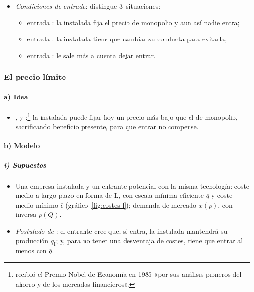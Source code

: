 \documentclass[11pt]{article}
\begin{document}
\begin{itemize}
\begin{itemize}
  \item {}, las que crean las propias instaladas con su conducta: el precio límite, la capacidad, la proliferación de marcas, la depredación o el aumento de los costes de los rivales. Para que disuadan, tienen que ser \emph{creíbles}, y eso es lo que la teoría de juegos permite juzgar .
  \end{itemize}
\item \emph{Condiciones de entrada}: \textcite{Bain1956Barriers} distingue 3~situaciones\nocite{Tirole1988Theory}:
  \begin{itemize}
  \item entrada : la instalada fija el precio de monopolio y aun así nadie entra;
  \item entrada : la instalada tiene que cambiar su conducta para evitarla;
  \item entrada : le sale más a cuenta dejar entrar.
  \end{itemize}
\end{itemize}

\subsubsection{El precio límite}\label{sec:precio-limite}

\paragraph{a) Idea}

\begin{itemize}
\item \textcite{Bain1949Note}, \textcite{SylosLabini1957Oligopolio} y \textcite{Modigliani1958New}:\footnote{ recibió el Premio Nobel de Economía en 1985 «por sus análisis pioneros del ahorro y de los mercados financieros»\nocite{Nobel1985Modigliani}.} la instalada puede fijar hoy un precio más bajo que el de monopolio, sacrificando beneficio presente, para que entrar no compense.
\end{itemize}

\paragraph{b) Modelo}

\subparagraph{i) Supuestos}

\begin{itemize}
\item Una empresa instalada y un entrante potencial con la misma tecnología: coste medio a largo plazo en forma de L, con escala mínima eficiente $\overline{q}$ y coste medio mínimo $\overline{c}$ (gráfico~\ref{fig:costes-l}); demanda de mercado $x(p)$, con inversa $p(Q)$.
\item \emph{Postulado de }: el entrante cree que, si entra, la instalada mantendrá su producción $q_{\mathrm I}$; y, para no tener una desventaja de costes, tiene que entrar al menos con $\overline{q}$.
\end{itemize}
\end{document}
